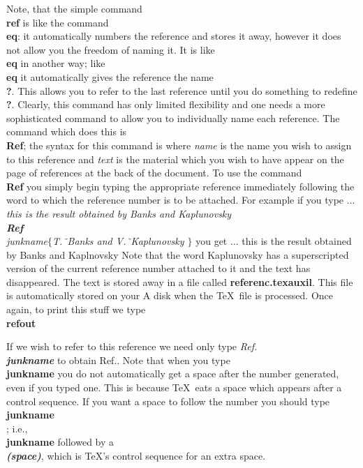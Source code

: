 Note, that the simple command {\bf \\ref} is like the command {\bf \\eq}:
it automatically numbers the reference and stores it away,
however it does not allow you the freedom of naming it.
It is like {\bf \\eq} in another way;
like {\bf \\eq} it automatically
gives the reference the name {\bf \\?}.
This allows you to refer to the last reference until
you do something to redefine {\bf \\?}.
Clearly, this command has only
limited flexibility and one needs a more sophisticated command
to allow you to individually name each reference.
The command which does this is {\bf \\Ref}; the syntax for this
command is
where {\it name} is the name you wish to assign to this
reference and {\it text} is the material which you wish to have
appear on the page of references at the back of the document.
To use the command {\bf \\Ref} you simply begin typing the
appropriate reference immediately following the word to which
the reference number is to be attached.
For example if you type \nextline
$ \ldots $ {\it this is the result obtained by Banks and
Kaplunovsky{\bf \\Ref\\}junkname{\bf $\{$}T.\~\ Banks
and V.\~\ Kaplunovsky \bf $\}$}
you get \nextline
$\ldots$ this is the result
obtained by Banks and Kaplnovsky\nextline
Note that the word Kaplunovsky has a superscripted version of the
current reference number attached to it and the text has disappeared.
The text is stored away in a file called
{\bf referenc.texauxil}.
This file is automatically stored on your A disk
when the \TeX\ file is processed.
Once again, to print this stuff we type {\bf \\refout}
 
 
\noindent If we wish to refer to this reference we need only type
{\it Ref. {\bf \\junkname}} to obtain Ref.\junkname .
Note that when you type {\bf \\junkname} you do not automatically
get a space after the number generated, even if you typed one.
This is because \TeX\ eats a space which appears after a control
sequence.
If you want a space to follow the number you should type
{\bf \\junkname\\ \quad }; i.e., {\bf \\junkname} followed
by a {\bf \\ \it (space)}, which is \TeX 's control sequence for an
extra space.
 
